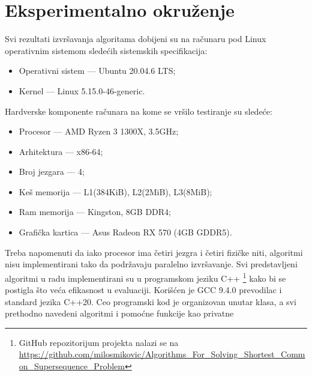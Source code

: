\documentclass[12pt,oneside]{memoir}
\begin{document}
\section{Eksperimentalno okruženje}
\label{sec:ekspOkruženje}
Svi rezultati izvršavanja algoritama dobijeni su na računaru pod Linux operativnim sistemom
sledećih sistemskih specifikacija:
\begin{itemize}
  \item Operativni sistem — Ubuntu 20.04.6 LTS;
  \item Kernel — Linux 5.15.0-46-generic.
\end{itemize}
Hardverske komponente računara na kome se vršilo testiranje su sledeće:
\begin{itemize}
  \item Procesor — AMD Ryzen 3 1300X, 3.5GHz;
  \item Arhitektura — x86-64;
  \item Broj jezgara — 4;
  \item Keš memorija — L1(384KiB), L2(2MiB), L3(8MiB);
  \item Ram memorija — Kingston, 8GB DDR4;
  \item Grafička kartica — Asus Radeon RX 570 (4GB GDDR5).
\end{itemize}
Treba napomenuti da iako procesor ima četiri jezgra i četiri
fizičke niti, algoritmi nisu implementirani tako da podržavaju paralelno izvršavanje.
Svi predstavljeni algoritmi u radu implementirani su u programskom jeziku C++
\footnote{GitHub repozitorijum projekta nalazi se na
\url{https://github.com/milosmikovic/Algorithms_For_Solving_Shortest_Common_Supersequence_Problem}}
kako bi se postigla što veća efikasnost u evaluaciji. Korišćen je
GCC 9.4.0 prevodilac i standard jezika C++20. Ceo programski kod je organizovan
unutar klasa, a svi prethodno navedeni algoritmi i pomoćne funkcije kao privatne
\end{document}
